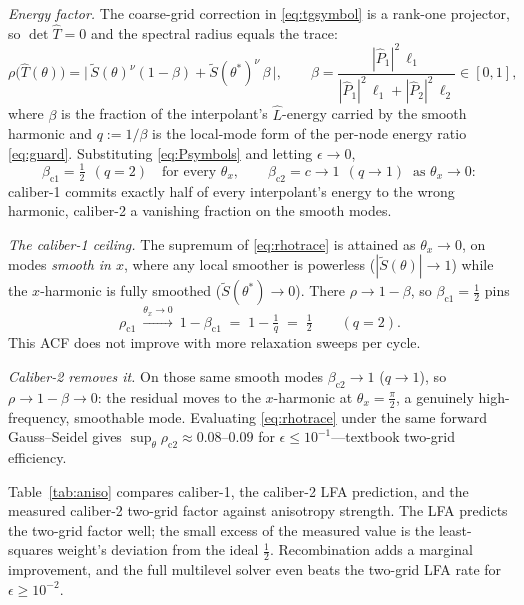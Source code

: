 \documentclass[leqno,letterpaper]{etna}
\begin{document}
\emph{Energy factor.} The coarse-grid correction in \eqref{eq:tgsymbol} is a rank-one projector, so $\det\hat T=0$
and the spectral radius equals the trace:
\begin{equation}\label{eq:rhotrace}
\rho\big(\hat T(\theta)\big)=\big|\,\tilde S(\theta)^{\nu}(1-\beta)+\tilde S(\theta^{\ast})^{\nu}\,\beta\,\big|,
\qquad
\beta=\frac{|\hat P_1|^2\,\ell_1}{|\hat P_1|^2\,\ell_1+|\hat P_2|^2\,\ell_2}\in[0,1],
\end{equation}
where $\beta$ is the fraction of the interpolant's $\hat L$-energy carried by the smooth harmonic and
$q:=1/\beta$ is the local-mode form of the per-node energy ratio \eqref{eq:guard}. Substituting
\eqref{eq:Psymbols} and letting $\epsilon\to0$,
\begin{equation}\label{eq:betas}
\beta_{\mathrm{c1}}=\tfrac12\ \ (q=2)\quad\text{for every }\theta_x,
\qquad
\beta_{\mathrm{c2}}=c\to1\ \ (q\to1)\ \text{ as }\theta_x\to0 :
\end{equation}
caliber-1 commits exactly half of every interpolant's energy to the wrong harmonic, caliber-2 a
vanishing fraction on the smooth modes.

\emph{The caliber-1 ceiling.} The supremum of \eqref{eq:rhotrace} is attained as $\theta_x\to0$, on modes
\emph{smooth in $x$}, where any local smoother is powerless ($|\tilde S(\theta)|\to1$) while the
$x$-harmonic is fully smoothed ($\tilde S(\theta^{\ast})\to0$). There $\rho\to1-\beta$, so
$\beta_{\mathrm{c1}}=\tfrac12$ pins
\begin{equation}\label{eq:c1ceiling}
\rho_{\mathrm{c1}}\ \xrightarrow{\theta_x\to0}\ 1-\beta_{\mathrm{c1}}\;=\;1-\tfrac1q\;=\;\tfrac12\qquad(q=2).
\end{equation}
This ACF does not improve with more relaxation sweeps per cycle.

\emph{Caliber-2 removes it.} On those same smooth modes $\beta_{\mathrm{c2}}\to1$ ($q\to1$), so
$\rho\to1-\beta\to0$: the residual moves to the $x$-harmonic at $\theta_x=\tfrac\pi2$, a genuinely
high-frequency, smoothable mode. Evaluating \eqref{eq:rhotrace} under the same forward Gauss--Seidel
gives $\sup_\theta\rho_{\mathrm{c2}}\approx0.08$--$0.09$ for $\epsilon\le10^{-1}$---textbook two-grid efficiency.

Table~\ref{tab:aniso} compares caliber-1, the caliber-2 LFA prediction, and the measured caliber-2 two-grid factor against anisotropy strength. The LFA predicts the two-grid factor well; the small excess of the measured value is the least-squares weight's deviation from the ideal $\tfrac12$. Recombination adds a marginal improvement, and the full multilevel solver even beats the two-grid LFA rate for $\epsilon\ge10^{-2}$.
\end{document}

